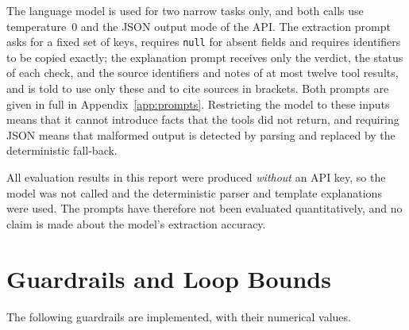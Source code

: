The language model is used for two narrow tasks only, and both calls use temperature~0 and the JSON
output mode of the API. The extraction prompt asks for a fixed set of keys, requires \texttt{null} for
absent fields and requires identifiers to be copied exactly; the explanation prompt receives only the
verdict, the status of each check, and the source identifiers and notes of at most twelve tool results,
and is told to use only these and to cite sources in brackets. Both prompts are given in full in Appendix~\ref{app:prompts}. Restricting the model
to these inputs means that it cannot introduce facts that the tools did not return, and requiring JSON
means that malformed output is detected by parsing and replaced by the deterministic fall-back.

All evaluation results in this report were produced \emph{without} an API key, so the model was not
called and the deterministic parser and template explanations were used. The prompts have therefore not
been evaluated quantitatively, and no claim is made about the model's extraction accuracy.

\section{Guardrails and Loop Bounds}

The following guardrails are implemented, with their numerical values.

